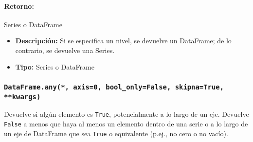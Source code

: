         \paragraph{Retorno:} Series o DataFrame
        \begin{itemize}
            \item \textbf{Descripción:} Si se especifica un nivel, se devuelve un DataFrame; de lo contrario, se devuelve una Series.
            \item \textbf{Tipo:} Series o DataFrame
        \end{itemize}



        \subsubsection{\texttt{DataFrame.any(*, axis=0, bool\_only=False, skipna=True, **kwargs)}}
        Devuelve si algún elemento es \texttt{True}, potencialmente a lo largo de un eje. Devuelve \texttt{False} a menos que haya al menos un elemento dentro de una serie o a lo largo de un eje de DataFrame que sea \texttt{True} o equivalente (p.ej., no cero o no vacío).

